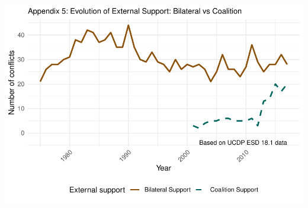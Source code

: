\documentclass[
]{article}
\begin{document}
\includegraphics{Dissertation_writeup_files/figure-latex/Coalition Support (Appendix 5)-1.pdf}
\end{document}
